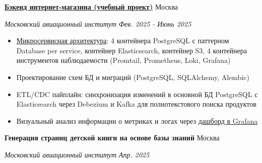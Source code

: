 \documentclass[14pt, a4paper, oneside]{extarticle}
\begin{document}

\begin{flushleft}
	\vspace{-0.8\intextsep}
	\quad
	\href{https://github.com/Crazy5202/eComm}{\textbf{Бэкенд интернет-магазина (учебный проект)}}
	\hfill
	Москва
\end{flushleft}

\begin{flushleft}
	\vspace{-1\intextsep}
	\quad
	\textit{Московский авиационный институт}
	\hfill
	\textit{\small Фев. 2025 - Июнь 2025}
\end{flushleft}


\begin{itemize}
	\vspace{-2\intextsep}
	\item \href{https://github.com/Crazy5202/job_application_form/tree/main/portfolio/eComm_C4.pdf}{Микросервисная архитектура}: 4 контейнера PostgreSQL с паттерном Database per service, контейнер Elasticsearch, контейнер S3, 4 контейнера инструментов наблюдаемости (Promtail, Prometheus, Loki, Grafana) 
	\vspace{-0.8\intextsep}
	\item Проектирование схем БД и миграций (PostgreSQL, SQLAlchemy, Alembic)
	\vspace{-0.8\intextsep}
	\item ETL/CDC пайплайн: синхронизация изменений в основной БД PostgreSQL с Elasticsearch через Debezium и Kafka для полнотекстового поиска продуктов
	\vspace{-0.8\intextsep}
	\item Визуальный анализ информации о метриках и логах через \href{https://github.com/Crazy5202/job_application_form/tree/main/portfolio/eComm_Grafana.pdf}{дашборд в Grafana}
\end{itemize}


\begin{flushleft}
	\vspace{-0.8\intextsep}
	\quad
	\textbf{Генерация страниц детской книги на основе базы знаний}
	\hfill
	Москва
\end{flushleft}

\begin{flushleft}
	\vspace{-1\intextsep}
	\quad
	\textit{Московский авиационный институт}
	\hfill
	\textit{\small Апр. 2025}
\end{flushleft}
\end{document}
